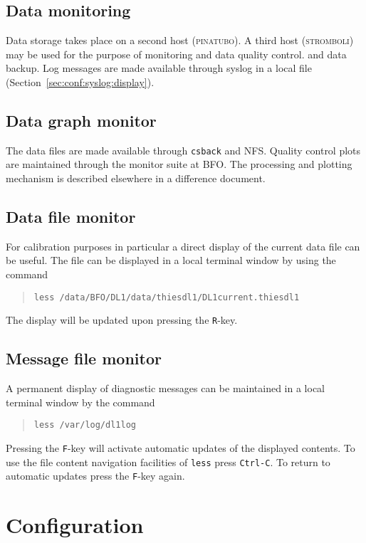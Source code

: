 \documentclass[twoside]{article}
\newcommand{\Dstoragehost}{\textsc{pinatubo}}
\newcommand{\Ddisplayhost}{\textsc{stromboli}}
\begin{document}
\begin{multicols}{2}
\section{Data monitoring}
Data storage takes place on a second host (\Dstoragehost).
A third host (\Ddisplayhost) may be used for the purpose of monitoring and
data quality control. and data backup.
Log messages are made available through syslog in a local file
(Section~\ref{sec:conf:syslog:display}).

\subsection{Data graph monitor}
The data files are made available through \texttt{csback} and NFS.
Quality control plots are maintained through the monitor suite at BFO.
The processing and plotting mechanism is described elsewhere in a difference
document.

\subsection{Data file monitor}
For calibration purposes in particular a direct display of the current data
file can be useful.
The file can be displayed in a local terminal window by using the command
\begin{quote}
\texttt{less /data/BFO/DL1/data/thiesdl1/DL1current.thiesdl1}
\end{quote}
The display will be updated upon pressing the \texttt{R}-key.

\subsection{Message file monitor}
A permanent display of diagnostic messages can be maintained in a local
terminal window by the command
\begin{quote}
\texttt{less /var/log/dl1log}
\end{quote}
Pressing the \texttt{F}-key will activate automatic updates of the displayed
contents.
To use the file content navigation facilities of \texttt{less} press
\texttt{Ctrl-C}.
To return to automatic updates press the \texttt{F}-key again.

\end{multicols}
\appendix
\section{Configuration}
\end{document}
